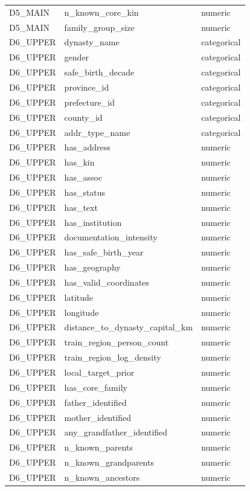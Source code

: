 \begin{longtable}{lll}
D5\_MAIN & n\_known\_core\_kin & numeric \\
D5\_MAIN & family\_group\_size & numeric \\
D6\_UPPER & dynasty\_name & categorical \\
D6\_UPPER & gender & categorical \\
D6\_UPPER & safe\_birth\_decade & categorical \\
D6\_UPPER & province\_id & categorical \\
D6\_UPPER & prefecture\_id & categorical \\
D6\_UPPER & county\_id & categorical \\
D6\_UPPER & addr\_type\_name & categorical \\
D6\_UPPER & has\_address & numeric \\
D6\_UPPER & has\_kin & numeric \\
D6\_UPPER & has\_assoc & numeric \\
D6\_UPPER & has\_status & numeric \\
D6\_UPPER & has\_text & numeric \\
D6\_UPPER & has\_institution & numeric \\
D6\_UPPER & documentation\_intensity & numeric \\
D6\_UPPER & has\_safe\_birth\_year & numeric \\
D6\_UPPER & has\_geography & numeric \\
D6\_UPPER & has\_valid\_coordinates & numeric \\
D6\_UPPER & latitude & numeric \\
D6\_UPPER & longitude & numeric \\
D6\_UPPER & distance\_to\_dynasty\_capital\_km & numeric \\
D6\_UPPER & train\_region\_person\_count & numeric \\
D6\_UPPER & train\_region\_log\_density & numeric \\
D6\_UPPER & local\_target\_prior & numeric \\
D6\_UPPER & has\_core\_family & numeric \\
D6\_UPPER & father\_identified & numeric \\
D6\_UPPER & mother\_identified & numeric \\
D6\_UPPER & any\_grandfather\_identified & numeric \\
D6\_UPPER & n\_known\_parents & numeric \\
D6\_UPPER & n\_known\_grandparents & numeric \\
D6\_UPPER & n\_known\_ancestors & numeric \\

\end{longtable}
